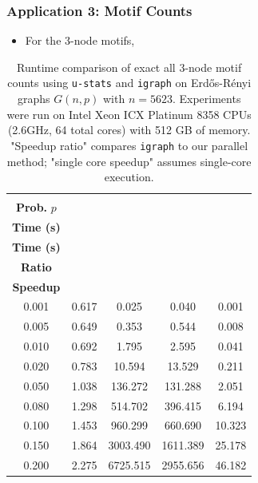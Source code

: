 \documentclass[9pt]{beamer}
\theoremstyle{mystyle}
\theoremstyle{mystyletwo}
\begin{document}
\begin{frame}
    \frametitle{Application 3: Motif Counts}
    \begin{itemize}
        \item For the 3-node motifs,
    \end{itemize}
    \begin{table}
        \centering
        \caption{
            Runtime comparison of exact all $3$-node motif counts using \texttt{u-stats} and \texttt{igraph} on Erdős-Rényi graphs $G(n, p)$ with $n = 5623$.
            Experiments were run on Intel Xeon ICX Platinum 8358 CPUs (2.6GHz, 64 total cores) with 512 GB of memory.
            "Speedup ratio" compares \texttt{igraph} to our parallel method; "single core speedup" assumes single-core execution.
        }
        \label{tab:motif_counts_3}
        \begin{tabular}{ccccc}
            \toprule
            \makecell{\textbf{Edge}                      \\ \textbf{Prob.} $p$} & \makecell{\textbf{\texttt{u-stats}} \\ \textbf{Time (s)}} & \makecell{\textbf{\texttt{igraph}} \\ \textbf{Time (s)}} &\makecell{\textbf{Speedup} \\ \textbf{Ratio}} &  \makecell{\textbf{Single-Core} \\ \textbf{Speedup}} \\
            \midrule
            0.001 & 0.617 & 0.025    & 0.040    & 0.001  \\
            0.005 & 0.649 & 0.353    & 0.544    & 0.008  \\
            0.010 & 0.692 & 1.795    & 2.595    & 0.041  \\
            0.020 & 0.783 & 10.594   & 13.529   & 0.211  \\
            0.050 & 1.038 & 136.272  & 131.288  & 2.051  \\
            0.080 & 1.298 & 514.702  & 396.415  & 6.194  \\
            0.100 & 1.453 & 960.299  & 660.690  & 10.323 \\
            0.150 & 1.864 & 3003.490 & 1611.389 & 25.178 \\
            0.200 & 2.275 & 6725.515 & 2955.656 & 46.182 \\
            \bottomrule
        \end{tabular}
    \end{table}
\end{frame}
\end{document}
